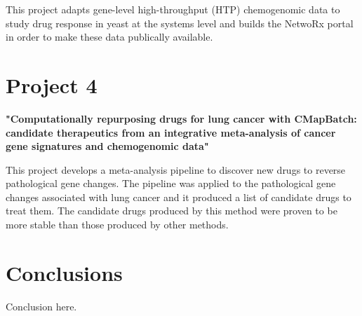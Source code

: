\documentclass{sig-alternate-05-2015}
\begin{document}
This project adapts gene-level high-throughput (HTP) chemogenomic data to study
drug response in yeast at the systems level and builds the NetwoRx portal in
order to make these data publically available.

\section{Project 4}
\textbf{"Computationally repurposing drugs for lung cancer with CMapBatch: candidate therapeutics from an integrative meta-analysis of cancer gene signatures and chemogenomic data"}
\vspace{5mm}

This project develops a meta-analysis pipeline to discover new drugs to reverse
pathological gene changes. The pipeline was applied to the pathological gene
changes associated with lung cancer and it produced a list of candidate drugs
to treat them. The candidate drugs produced by this method were proven to be
more stable than those produced by other methods.

\section{Conclusions}
Conclusion here.
\end{document}
